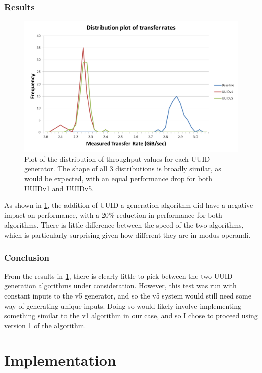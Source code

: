 \documentclass[a4paper,12pt,twoside,openright]{report}
\begin{document}
	\subsection{Results}
	
	\begin{figure}
		\includegraphics[width=\linewidth]{include/IPC-uuid-bench.png}
		\caption{Plot of the distribution of throughput values for each UUID generator. The shape of all 3 distributions is broadly similar, as would be expected, with an equal performance drop for both UUIDv1 and UUIDv5.}
		\label{fig:IPC-uuid-bench}
	\end{figure}
	
	As shown in \figurename{\ref{fig:IPC-uuid-bench}}, the addition of UUID a generation algorithm did have a negative impact on performance, with a 20\% reduction in performance for both algorithms. There is little difference between the speed of the two algorithms, which is particularly surprising given how different they are in modus operandi.
	
	\subsection{Conclusion}
	
	From the results in \figurename{\ref{fig:IPC-uuid-bench}}, there is clearly little to pick between the two UUID generation algorithms under consideration. However, this test was run with constant inputs to the v5 generator, and so the v5 system would still need some way of generating unique inputs. Doing so would likely involve implementing something similar to the v1 algorithm in our case, and so I chose to proceed using version 1 of the algorithm.
	
	
	\chapter{Implementation}
	
\end{document}
